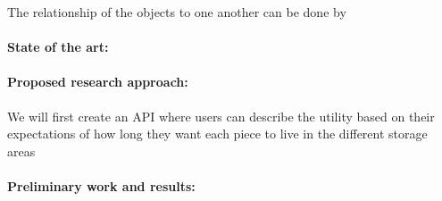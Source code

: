 The relationship of the objects to one another can be done by

\paragraph{State of the art:} 
\paragraph{Proposed research approach:} 
We will first create an API where users can describe the utility based on their expectations of how
long they want each piece to live in the different storage areas
\paragraph{Preliminary work and results:}
